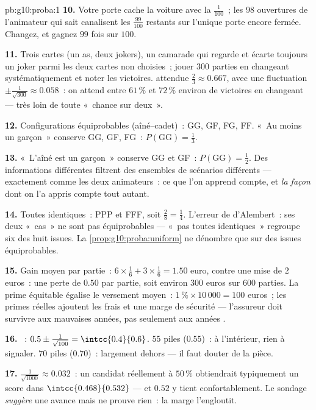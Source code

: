 \begin{solution}{pb:g10:proba:1}
\textbf{10.} Votre porte cache la voiture avec la 
$\frac{1}{100}$~; les $98$ ouvertures de l'animateur qui sait
canalisent les $\frac{99}{100}$ restants sur l'unique porte encore
fermée. Changez, et gagnez $99$ fois sur $100$.

\textbf{11.} Trois cartes (un as, deux jokers), un camarade qui
regarde et écarte toujours un joker parmi les deux cartes non
choisies~; jouer $300$ parties en changeant systématiquement et noter
les victoires.  attendue $\frac23 \approx 0.667$, avec une
fluctuation $\pm\frac{1}{\sqrt{300}} \approx 0.058$~: on attend entre
$61\,\%$ et $72\,\%$ environ de victoires en changeant --- très loin
de toute «~chance sur deux~».

\textbf{12.} Configurations équiprobables (aîné--cadet)~: GG, GF,
FG, FF. «~Au moins un garçon~» conserve GG, GF, FG~:
$P(\text{GG}) = \frac13$.

\textbf{13.} «~L'aîné est un garçon~» conserve GG et GF~:
$P(\text{GG}) = \frac12$. Des informations différentes filtrent des
ensembles de scénarios différents --- exactement comme les deux
animateurs~: ce que l'on apprend compte, et \emph{la façon} dont on
l'a appris compte tout autant.

\textbf{14.} Toutes identiques~: PPP et FFF, soit
$\frac28 = \frac14$. L'erreur de d'Alembert~: ses deux «~cas~» ne
sont pas équiprobables --- «~pas toutes identiques~» regroupe six des
huit issues. La \cref{prop:g10:proba:uniform} ne dénombre que sur des
issues équiprobables.

\textbf{15.} Gain moyen par partie~: $6 \times \frac16 + 3
\times \frac16 = 1.50$ euro, contre une mise de $2$ euros~: une perte
 de $0.50$ par partie, soit environ $300$ euros sur $600$
parties. La prime équitable égalise le versement moyen~:
$1\,\% \times 10\,000 = 100$ euros~; les primes réelles ajoutent les
frais et une marge de sécurité --- l'assureur doit survivre aux
mauvaises années, pas seulement aux années .

\textbf{16.} ~: $0.5 \pm \frac{1}{\sqrt{100}} =
\intcc{0.4}{0.6}$. $55$ piles ($0.55$)~: à l'intérieur, rien à
signaler. $70$ piles ($0.70$)~: largement dehors --- il faut douter
de la pièce.

\textbf{17.} $\frac{1}{\sqrt{1000}} \approx 0.032$~: un candidat
réellement à $50\,\%$ obtiendrait typiquement un score dans
$\intcc{0.468}{0.532}$ --- et $0.52$ y tient confortablement. Le
sondage \emph{suggère} une avance mais ne prouve rien~: la marge
l'engloutit.


\end{solution}
